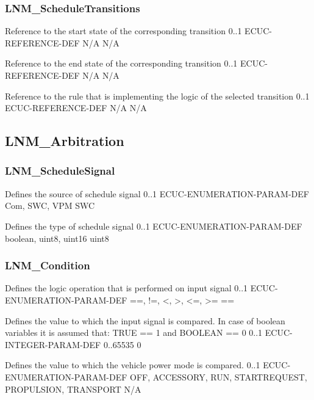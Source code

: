 \subsubsection{LNM_ScheduleTransitions}


{Reference to the start state of the corresponding transition}
{0..1}
{ECUC-REFERENCE-DEF}
{N/A}
{N/A}


{Reference to the end state of the corresponding transition}
{0..1}
{ECUC-REFERENCE-DEF}
{N/A}
{N/A}


{Reference to the rule that is implementing the logic of the selected transition}
{0..1}
{ECUC-REFERENCE-DEF}
{N/A}
{N/A}


\subsection{LNM_Arbitration}
\label{subsec:LNM_Arbitration}

\subsubsection{LNM_ScheduleSignal}


{Defines the source of schedule signal}
{0..1}
{ECUC-ENUMERATION-PARAM-DEF}
{Com, SWC, VPM}
{SWC}


{Defines the type of schedule signal}
{0..1}
{ECUC-ENUMERATION-PARAM-DEF}
{boolean, uint8, uint16}
{uint8}


\subsubsection{LNM_Condition}


{Defines the logic operation that is performed on input signal}
{0..1}
{ECUC-ENUMERATION-PARAM-DEF}
{==, !=, <, >, <=, >=}
{==}


{Defines the value to which the input signal is compared. In case of boolean variables it is assumed that: TRUE == 1 and BOOLEAN == 0}
{0..1}
{ECUC-INTEGER-PARAM-DEF}
{0..65535}
{0}


{Defines the value to which the vehicle power mode is compared.}
{0..1}
{ECUC-ENUMERATION-PARAM-DEF}
{OFF, ACCESSORY, RUN, STARTREQUEST, PROPULSION, TRANSPORT}
{N/A}


